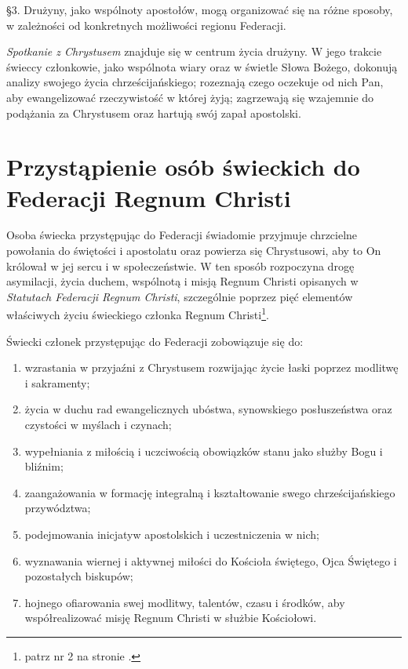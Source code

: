 \S{}3. Drużyny, jako wspólnoty apostołów, mogą organizować się na różne sposoby, w zależności od konkretnych możliwości regionu Federacji.


 {\em Spotkanie z Chrystusem} znajduje się w centrum życia drużyny. W jego trakcie świeccy członkowie, jako wspólnota wiary oraz w świetle Słowa Bożego, dokonują analizy swojego życia chrześcijańskiego; rozeznają czego oczekuje od nich Pan, aby ewangelizować rzeczywistość w której żyją; zagrzewają się wzajemnie do podążania za Chrystusem oraz hartują swój zapał apostolski.

\chapter{Przystąpienie osób świeckich do Federacji Regnum Christi}


 Osoba świecka przystępując do Federacji świadomie przyjmuje chrzcielne powołania do świętości i apostolatu oraz powierza się Chrystusowi, aby to On królował w jej sercu i w społeczeństwie. W ten sposób rozpoczyna drogę asymilacji, życia duchem, wspólnotą i misją Regnum Christi opisanych w {\em Statutach Federacji Regnum Christi}, szczególnie poprzez pięć elementów właściwych życiu świeckiego członka Regnum Christi\footnote{patrz nr 2 na stronie \pageref{numerdwa}.}.

\filbreak{}

 Świecki członek przystępując do Federacji zobowiązuje się do:
\begin{enumerate}
	
	\item wzrastania w przyjaźni z Chrystusem rozwijając życie łaski poprzez modlitwę i sakramenty;
	
	\item życia w duchu rad ewangelicznych ubóstwa, synowskiego posłuszeństwa oraz czystości w myślach i czynach;
	
	\item wypełniania z miłością i uczciwością obowiązków stanu jako służby Bogu i bliźnim;
	
	\item zaangażowania w formację integralną i kształtowanie swego chrześcijańskiego przywództwa;
	
	\item podejmowania inicjatyw apostolskich i uczestniczenia w nich;
	
	\item wyznawania wiernej i aktywnej miłości do Kościoła świętego, Ojca Świętego i pozostałych biskupów;
	
	\item hojnego ofiarowania swej modlitwy, talentów, czasu i środków, aby współrealizować misję Regnum Christi w służbie Kościołowi.
\end{enumerate}

